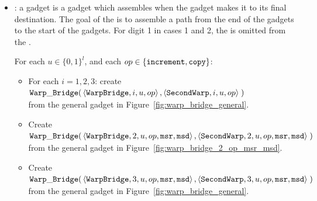 \begin{itemize}
    \item {\warpbridge}: a {\warpbridge} gadget is a gadget which assembles when the {\firstwarp} gadget makes it
         to its final destination. The goal of the {\warpbridge} is to assemble a path from the end of the {\firstwarp}
         gadgets to the start of the {\secondwarp} gadgets. For digit 1 in cases 1 and 2, the {\warpbridge} is omitted
         from the {\warpunit}.

    For each $u \in \{0, 1\}^l$, and each $op \in \{ {\tt increment, copy } \}$:
    \begin{itemize}

        \item For each $i = 1,2,3$: create
        $\begin{aligned}[t]
            {\tt Warp\_Bridge}(& \left\langle {\tt WarpBridge}, i, u, op \right\rangle,
                          \left\langle {\tt SecondWarp}, i, u, op \right\rangle \;)
        \end{aligned}$ \\ from the general gadget in Figure~\ref{fig:warp_bridge_general}.
        \vspace{.5cm}

        \item Create
        $\begin{aligned}[t]
            {\tt Warp\_Bridge}(& \left\langle {\tt WarpBridge}, 2, u, op, {\tt msr}, {\tt msd} \right\rangle,
                          \left\langle {\tt SecondWarp}, 2, u, op, {\tt msr}, {\tt msd} \right\rangle \;)
        \end{aligned}$ \\ from the general gadget in Figure~\ref{fig:warp_bridge_2_op_msr_msd}.
        \vspace{.5cm}

        \item Create
        $\begin{aligned}[t]
            {\tt Warp\_Bridge}(& \left\langle {\tt WarpBridge}, 3, u, op, {\tt msr}, {\tt msd} \right\rangle,
                          \left\langle {\tt SecondWarp}, 3, u, op, {\tt msr}, {\tt msd} \right\rangle \;)
        \end{aligned}$ \\ from the general gadget in Figure~\ref{fig:warp_bridge_general}.
        \vspace{.5cm}
    \end{itemize}



\end{itemize}
